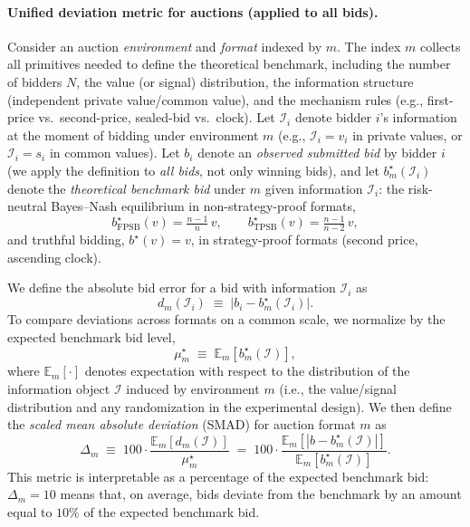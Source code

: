 \paragraph{Unified deviation metric for auctions (applied to all bids).}
Consider an auction \emph{environment} and \emph{format} indexed by $m$. The
index $m$ collects all primitives needed to define the theoretical benchmark,
including the number of bidders $N$, the value (or signal) distribution, the
information structure (independent private value/common value), and the
mechanism rules (e.g., first-price vs.\ second-price, sealed-bid vs.\ clock).
Let $\mathcal I_i$ denote bidder $i$'s information at the moment of bidding
under environment $m$ (e.g., $\mathcal I_i=v_i$ in private values, or
$\mathcal I_i=s_i$ in common values). Let $b_{i}$ denote an \emph{observed
submitted bid} by bidder $i$ (we apply the definition to \emph{all bids}, not
only winning bids), and let $b_m^\star(\mathcal I_i)$ denote the
\emph{theoretical benchmark bid} under $m$ given information $\mathcal I_i$:
the risk-neutral Bayes--Nash equilibrium in non-strategy-proof formats,
\[
b^\star_{\text{FPSB}}(v) = \tfrac{n-1}{n}\, v, \qquad
b^\star_{\text{TPSB}}(v) = \tfrac{n-1}{n-2}\, v,
\]
and truthful bidding, $b^\star(v)=v$, in strategy-proof formats (second price,
ascending clock).

\noindent We define the absolute bid error for a bid with information
$\mathcal I_i$ as
\[
d_m(\mathcal I_i)\;\equiv\;\bigl|b_i - b_m^\star(\mathcal I_i)\bigr|.
\]
To compare deviations across formats on a common scale, we normalize by the
expected benchmark bid level,
\[
\mu_m^\star \;\equiv\; \mathbb E_m\!\left[b_m^\star(\mathcal I)\right],
\]
where $\mathbb E_m[\cdot]$ denotes expectation with respect to the distribution
of the information object $\mathcal I$ induced by environment $m$ (i.e., the
value/signal distribution and any randomization in the experimental design). We
then define the \emph{scaled mean absolute deviation} (SMAD) for auction format
$m$ as
\[
\Delta_m \;\equiv\; 100 \cdot \frac{\mathbb E_m\!\left[d_m(\mathcal I)\right]}{\mu_m^\star}
\;=\; 100 \cdot \frac{\mathbb E_m\!\left[\left|b-b_m^\star(\mathcal I)\right|\right]}{\mathbb E_m\!\left[b_m^\star(\mathcal I)\right]}.
\]
This metric is interpretable as a percentage of the expected benchmark bid:
$\Delta_m=10$ means that, on average, bids deviate from the benchmark by an
amount equal to $10\%$ of the expected benchmark bid.

